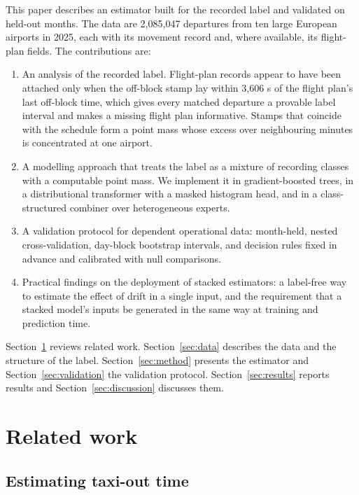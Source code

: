 \documentclass[
  manuscript=article,  %
  layout=preprint,  %
  year=20xx,
  volume=x,
]{extra/joas}
\begin{document}
This paper describes an estimator built for the recorded label and validated on held-out months. The data are 2,085,047 departures from ten large European airports in 2025, each with its movement record and, where available, its flight-plan fields. The contributions are:

\begin{enumerate}
  \item An analysis of the recorded label. Flight-plan records appear to have been attached only when the off-block stamp lay within 3,606 s of the flight plan's last off-block time, which gives every matched departure a provable label interval and makes a missing flight plan informative. Stamps that coincide with the schedule form a point mass whose excess over neighbouring minutes is concentrated at one airport.
  \item A modelling approach that treats the label as a mixture of recording classes with a computable point mass. We implement it in gradient-boosted trees, in a distributional transformer with a masked histogram head, and in a class-structured combiner over heterogeneous experts.
  \item A validation protocol for dependent operational data: month-held, nested cross-validation, day-block bootstrap intervals, and decision rules fixed in advance and calibrated with null comparisons.
  \item Practical findings on the deployment of stacked estimators: a label-free way to estimate the effect of drift in a single input, and the requirement that a stacked model's inputs be generated in the same way at training and prediction time.
\end{enumerate}

Section~\ref{sec:related} reviews related work. Section~\ref{sec:data} describes the data and the structure of the label. Section~\ref{sec:method} presents the estimator and Section~\ref{sec:validation} the validation protocol. Section~\ref{sec:results} reports results and Section~\ref{sec:discussion} discusses them.


\section{Related work}
\label{sec:related}

\subsection{Estimating taxi-out time}
\end{document}
